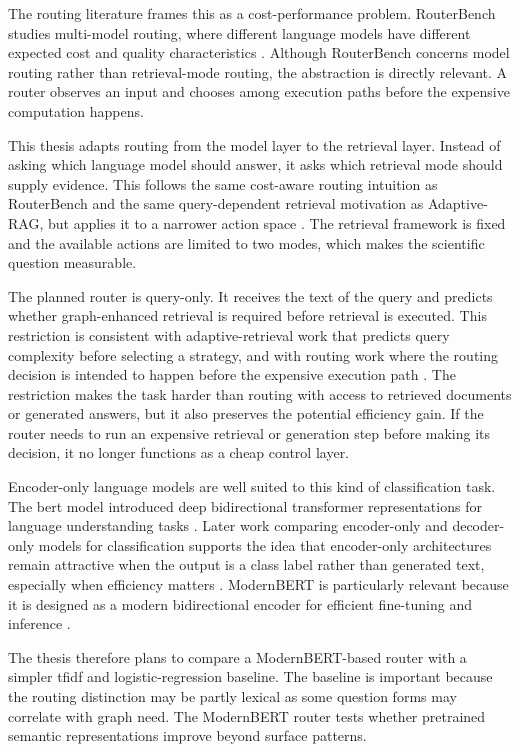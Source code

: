 \documentclass[english, bibtex]{kththesis}               %
\numberwithin{listing}{chapter}
\begin{document}
The routing literature frames this as a cost-performance problem. RouterBench studies multi-model routing, where different language models have different expected cost and quality characteristics \cite{hu2024routerbench}. Although RouterBench concerns model routing rather than retrieval-mode routing, the abstraction is directly relevant. A router observes an input and chooses among execution paths before the expensive computation happens.

This thesis adapts routing from the model layer to the retrieval layer. Instead of asking which language model should answer, it asks which retrieval mode should supply evidence. This follows the same cost-aware routing intuition as RouterBench and the same query-dependent retrieval motivation as Adaptive-RAG, but applies it to a narrower action space \cite{hu2024routerbench,jeong2024adaptiverag}. The retrieval framework is fixed and the available actions are limited to two modes, which makes the scientific question measurable.

The planned router is query-only. It receives the text of the query and predicts whether graph-enhanced retrieval is required before retrieval is executed. This restriction is consistent with adaptive-retrieval work that predicts query complexity before selecting a strategy, and with routing work where the routing decision is intended to happen before the expensive execution path \cite{jeong2024adaptiverag,hu2024routerbench}. The restriction makes the task harder than routing with access to retrieved documents or generated answers, but it also preserves the potential efficiency gain. If the router needs to run an expensive retrieval or generation step before making its decision, it no longer functions as a cheap control layer.

Encoder-only language models are well suited to this kind of classification task. The \gls{bert} model introduced deep bidirectional transformer representations for language understanding tasks \cite{devlin2019bert}. Later work comparing encoder-only and decoder-only models for classification supports the idea that encoder-only architectures remain attractive when the output is a class label rather than generated text, especially when efficiency matters \cite{benayas2024encoder}. ModernBERT is particularly relevant because it is designed as a modern bidirectional encoder for efficient fine-tuning and inference \cite{warner2024modernbert}.

The thesis therefore plans to compare a ModernBERT-based router with a simpler \gls{tfidf} and logistic-regression baseline. The baseline is important because the routing distinction may be partly lexical as some question forms may correlate with graph need. The ModernBERT router tests whether pretrained semantic representations improve beyond surface patterns.
\end{document}
